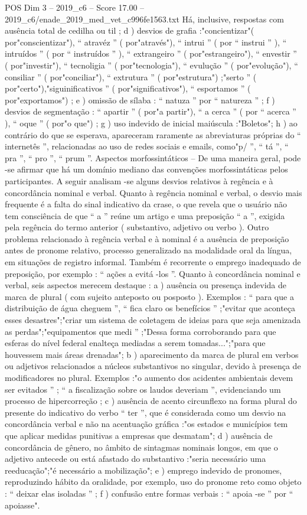 \begin{textsample}{POS Dim 3 – 2019\_c6 – Score 17.00 – 2019\_c6/enade\_2019\_med\_vet\_c996fe1563.txt}
Há, inclusive, respostas com ausência total de cedilha ou til ; d ) desvios de grafia :"concientizar"( por"conscientizar"), “ atravéz ” ( por"através"), “ intrui ” ( por “ instrui ” ), “ intruídos ” ( por “ instruídos ” ), “ extrangeiro ” ( por"estrangeiro"), “ envestir ” ( por"investir"), “ tecnoligia ” ( por"tecnologia"), “ evulução ” ( por"evolução"), “ consiliar ” ( por"conciliar"), “ extrutura ” ( por"estrutura") ;"serto ” ( por"certo"),"siguinificativos ” ( por"significativos"), “ esportamos ” ( por"exportamos") ; e ) omissão de sílaba : “ natuza ” por “ natureza ” ; f ) desvios de segmentação : “ apartir ” ( por"a partir"), “ a cerca ” ( por “ acerca ” ), “ oque ” ( por"o que") ; g ) uso indevido de inicial maiúscula :"Boletos"; h ) ao contrário do que se esperava, apareceram raramente as abreviaturas próprias do “ internetês ”, relacionadas ao uso de redes sociais e emails, como"p/ ”, “ tá ”, “ pra ”, “ pro ”, “ prum ”.
Aspectos morfossintáticos – De uma maneira geral, pode -se afirmar que há um domínio mediano das convenções morfossintáticas pelos participantes.
A seguir analisam -se alguns desvios relativos à regência e à concordância nominal e verbal.
Quanto à regência nominal e verbal, o desvio mais frequente é a falta do sinal indicativo da crase, o que revela que o usuário não tem consciência de que “ a ” reúne um artigo e uma preposição “ a ”, exigida pela regência do termo anterior ( substantivo, adjetivo ou verbo ).
Outro problema relacionado à regência verbal e à nominal é a ausência de preposição antes de pronome relativo, processo generalizado na modalidade oral da língua, em situações de registro informal.
Também é recorrente o emprego inadequado de preposição, por exemplo : “ ações a evitá -los ”.
Quanto à concordância nominal e verbal, seis aspectos merecem destaque : a ) ausência ou presença indevida de marca de plural ( com sujeito anteposto ou posposto ).
Exemplos : “ para que a distribuição de água cheguem ”, “ fica claro os benefícios ” ;"evitar que aconteça esses desastres";"criar um sistema de coletagem de ideias para que seja amenizada as perdas";"equipamentos que medi ” ;"Dessa forma corroborando para que esferas do nível federal enalteça mediadas a serem tomadas...";"para que houvessem mais áreas drenadas"; b ) aparecimento da marca de plural em verbos ou adjetivos relacionados a núcleos substantivos no singular, devido à presença de modificadores no plural.
Exemplos :"o aumento dos acidentes ambientais devem ser evitados ” ; “ a fiscalização sobre os laudos deveriam ”, evidenciando um processo de hipercorreção ; c ) ausência de acento circunflexo na forma plural do presente do indicativo do verbo “ ter ”, que é considerada como um desvio na concordância verbal e não na acentuação gráfica :"os estados e municípios tem que aplicar medidas punitivas a empresas que desmatam"; d ) ausência de concordância de gênero, no âmbito de sintagmas nominais longos, em que o adjetivo antecede ou está afastado do substantivo :"seria necessário uma reeducação";"é necessário a mobilização"; e ) emprego indevido de pronomes, reproduzindo hábito da oralidade, por exemplo, uso do pronome reto como objeto : “ deixar elas isoladas ” ; f ) confusão entre formas verbais : “ apoia -se ” por “ apoiasse".

\end{textsample}
